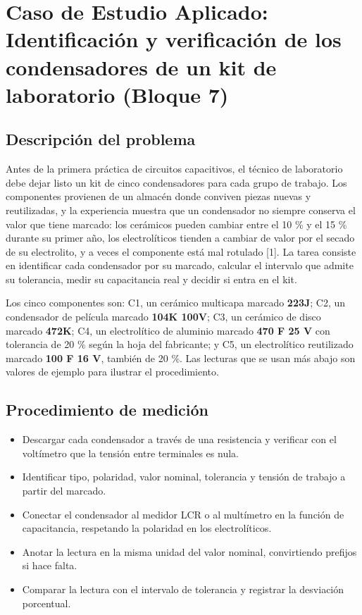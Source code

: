 \documentclass[11pt,letterpaper]{article}
\begin{document}
\section{Caso de Estudio Aplicado: Identificación y verificación de los condensadores de un kit de laboratorio (Bloque 7)}

\subsection{Descripción del problema}

Antes de la primera práctica de circuitos capacitivos, el técnico de laboratorio debe dejar listo un kit de cinco condensadores para cada grupo de trabajo. Los componentes provienen de un almacén donde conviven piezas nuevas y reutilizadas, y la experiencia muestra que un condensador no siempre conserva el valor que tiene marcado: los cerámicos pueden cambiar entre el 10 \% y el 15 \% durante su primer año, los electrolíticos tienden a cambiar de valor por el secado de su electrolito, y a veces el componente está mal rotulado [1]. La tarea consiste en identificar cada condensador por su marcado, calcular el intervalo que admite su tolerancia, medir su capacitancia real y decidir si entra en el kit.

Los cinco componentes son: C1, un cerámico multicapa marcado \textbf{223J}; C2, un condensador de película marcado \textbf{104K 100V}; C3, un cerámico de disco marcado \textbf{472K}; C4, un electrolítico de aluminio marcado \textbf{470 \textmu{}F 25 V} con tolerancia de \textpm{}20 \% según la hoja del fabricante; y C5, un electrolítico reutilizado marcado \textbf{100 \textmu{}F 16 V}, también de \textpm{}20 \%. Las lecturas que se usan más abajo son valores de ejemplo para ilustrar el procedimiento.

\subsection{Procedimiento de medición}

\begin{itemize}
  \item Descargar cada condensador a través de una resistencia y verificar con el voltímetro que la tensión entre terminales es nula.
  \item Identificar tipo, polaridad, valor nominal, tolerancia y tensión de trabajo a partir del marcado.
  \item Conectar el condensador al medidor LCR o al multímetro en la función de capacitancia, respetando la polaridad en los electrolíticos.
  \item Anotar la lectura en la misma unidad del valor nominal, convirtiendo prefijos si hace falta.
  \item Comparar la lectura con el intervalo de tolerancia y registrar la desviación porcentual.
\end{itemize}
\end{document}

